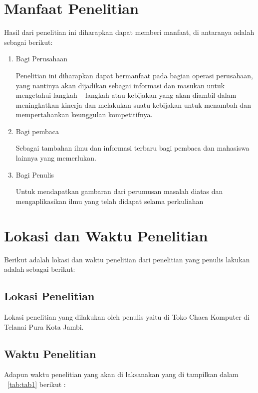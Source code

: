 \section{Manfaat Penelitian}
Hasil dari penelitian ini diharapkan dapat memberi manfaat, di antaranya adalah sebagai berikut:
\begin{enumerate}
	\item Bagi Perusahaan
	
	Penelitian ini diharapkan dapat bermanfaat pada bagian operasi perusahaan, yang nantinya akan dijadikan sebagai informasi dan masukan untuk mengetahui langkah – langkah atau kebijakan yang akan diambil dalam meningkatkan kinerja dan melakukan suatu kebijakan untuk menambah dan mempertahankan keunggulan kompetitifnya.
	
	\item Bagi pembaca
	
	Sebagai tambahan ilmu dan informasi terbaru bagi pembaca dan mahasiswa lainnya yang memerlukan. 
	\item Bagi Penulis 
	
	Untuk mendapatkan gambaran dari perumusan masalah diatas dan mengaplikasikan ilmu yang telah didapat selama perkuliahan 
\end{enumerate}

\section{Lokasi dan Waktu Penelitian}
Berikut adalah lokasi dan waktu penelitian dari penelitian yang penulis lakukan adalah sebagai berikut:

\subsection{Lokasi Penelitian}
Lokasi penelitian yang dilakukan oleh penulis yaitu di Toko Chaca Komputer di Telanai Pura Kota Jambi.

\subsection{Waktu Penelitian}
Adapun waktu penelitian yang akan di laksanakan yang di tampilkan dalam \tab~\ref{tab:tab1} berikut :

